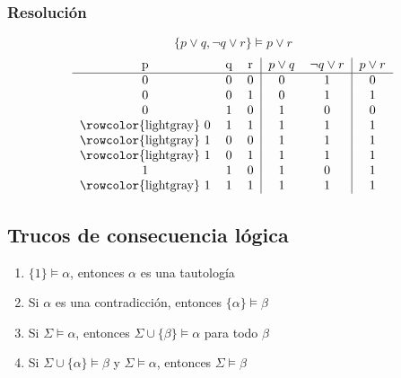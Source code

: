 \documentclass[../main.tex]{subfiles}
\begin{document}
\subsubsection{Resolución}
$$\{ p \vee{} q, \neg{} q \vee{} r \} \models{} p \vee{} r$$
\[
    \begin{tabular}{ccc|cc|c}
        p & q & r & $p \vee{} q$ & $\neg{} q \vee{} r$ & $p \vee{} r$ \\ \hline
        0 & 0 & 0 & 0 & 1 & 0\\
        0 & 0 & 1 & 0 & 1 & 1\\
        0 & 1 & 0 & 1 & 0 & 0\\
        \rowcolor{lightgray} 0 & 1 & 1 & 1 & 1 & 1\\
        \rowcolor{lightgray} 1 & 0 & 0 & 1 & 1 & 1\\
        \rowcolor{lightgray} 1 & 0 & 1 & 1 & 1 & 1\\
        1 & 1 & 0 & 1 & 0 & 1\\
        \rowcolor{lightgray} 1 & 1 & 1 & 1 & 1 & 1\\
    \end{tabular}
\]

\subsection{Trucos de consecuencia lógica}
\begin{enumerate}
    \item $\{ 1 \} \models{} \alpha{}$, entonces $\alpha$ es una tautología
    \item Si $\alpha$ es una contradicción, entonces $\{ \alpha{} \} \models{} \beta{}$
    \item Si $\Sigma{} \models{} \alpha{}$, entonces $\Sigma{} \cup{} \{ \beta{} \} \models{} \alpha{}$ para todo $\beta$
    \item Si $\Sigma{} \cup{} \{ \alpha{} \} \models{} \beta{}$ y $\Sigma{} \models{} \alpha{}$, entonces $\Sigma{} \models{} \beta{}$
\end{enumerate}
\end{document}
